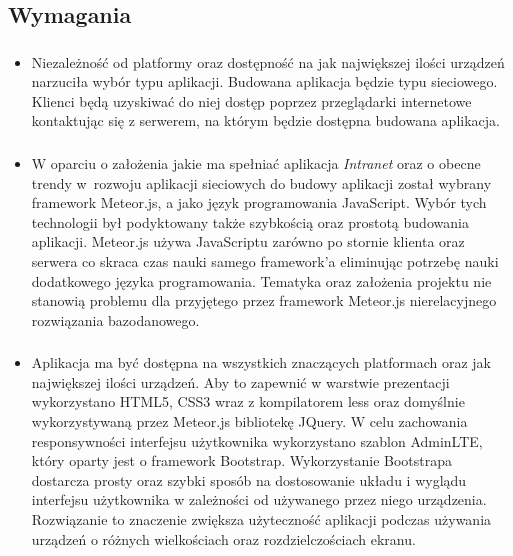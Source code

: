 \documentclass{beamer}
\newenvironment{justbe}%
{\setlength{\leftmargini}{0pt}\begin{itemize}\item[]}%
{\end{itemize}}
\begin{document}
\subsection{Wymagania}
\begin{frame}
 \frametitle{}
 \begin{justbe}
  Niezależność od platformy oraz dostępność na jak największej ilości urządzeń narzuciła wybór typu aplikacji. Budowana aplikacja będzie typu sieciowego. Klienci będą uzyskiwać do niej dostęp poprzez przeglądarki internetowe kontaktując się z serwerem, na którym będzie dostępna budowana aplikacja. 
 \end{justbe}
\end{frame}

\begin{frame}
 \frametitle{}
 \begin{justbe}
  W oparciu o założenia jakie ma spełniać aplikacja \emph{Intranet} oraz o obecne trendy w~rozwoju aplikacji sieciowych do budowy aplikacji został wybrany framework Meteor.js, a jako język programowania JavaScript. Wybór tych technologii był podyktowany także szybkością oraz prostotą budowania aplikacji. Meteor.js używa JavaScriptu zarówno po stornie klienta oraz serwera co skraca czas nauki samego framework'a eliminując potrzebę nauki dodatkowego języka programowania. Tematyka oraz założenia projektu nie stanowią problemu dla przyjętego przez framework Meteor.js nierelacyjnego rozwiązania bazodanowego.
 \end{justbe}
\end{frame}

\begin{frame}
 \frametitle{}
 \begin{justbe}
  Aplikacja ma być dostępna na wszystkich znaczących platformach oraz jak największej ilości urządzeń. Aby to zapewnić w warstwie prezentacji wykorzystano HTML5, CSS3 wraz z kompilatorem less oraz domyślnie wykorzystywaną przez Meteor.js bibliotekę JQuery. W celu zachowania responsywności interfejsu użytkownika wykorzystano szablon AdminLTE, który oparty jest o framework Bootstrap. Wykorzystanie Bootstrapa dostarcza prosty oraz szybki sposób na dostosowanie układu i wyglądu interfejsu użytkownika w zależności od używanego przez niego urządzenia. Rozwiązanie to znaczenie zwiększa użyteczność aplikacji podczas używania urządzeń o różnych wielkościach oraz rozdzielczościach ekranu. 
 \end{justbe}
\end{frame}
\end{document}
